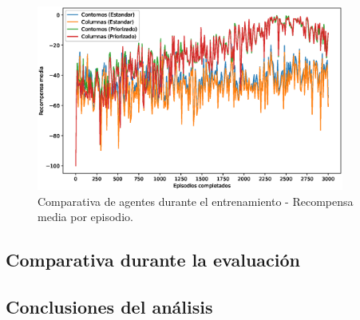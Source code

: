 \begin{figure}[h]
    \centering
    \includegraphics[width=0.9\textwidth]{imagenes/cap6/comparison/smoothed_rewards.eps}
    \caption{Comparativa de agentes durante el entrenamiento - Recompensa media por episodio.}
    \label{fig:chap6-comparison-rewards}
\end{figure}

\subsection{Comparativa durante la evaluación}


\subsection{Conclusiones del análisis}